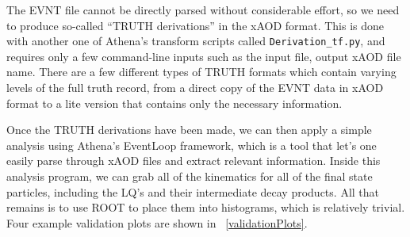         The EVNT file cannot be directly parsed without considerable effort, so we need to produce so-called ``TRUTH derivations'' in the xAOD format. This is done with another one of Athena's transform scripts called \texttt{Derivation_tf.py}, and requires only a few command-line inputs such as the input file, output xAOD file name. There are a few different types of TRUTH formats which contain varying levels of the full truth record, from a direct copy of the EVNT data in xAOD format to a lite version that contains only the necessary information.

        Once the TRUTH derivations have been made, we can then apply a simple analysis using Athena's EventLoop framework, which is a tool that let's one easily parse through xAOD files and extract relevant information. Inside this analysis program, we can grab all of the kinematics for all of the final state particles, including the LQ's and their intermediate decay products. All that remains is to use ROOT to place them into histograms, which is relatively trivial. Four example validation plots are shown in ~\ref{validationPlots}.
        
